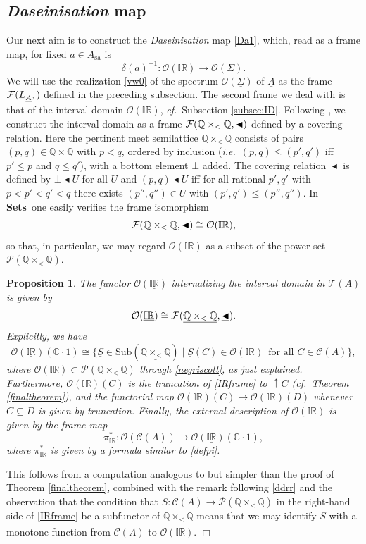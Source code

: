 \documentclass[12pt]{article}
\newcommand{\IR}{\mathbb{IR}}
\newcommand{\Q}{\mathbb{Q}}
\newcommand{\uIR}{\underline{\mathbb{IR}}}
\newcommand{\drie}{\vartriangleleft}
\newcommand{\coveredd}{\ensuremath{\mathop{\blacktriangleleft}}}
\newcommand{\beq}{\begin{equation}}
\newcommand{\eeq}{\end{equation}}
\newcommand{\Sets}{\mbox{\textbf{Sets}}}
\newcommand{\raw}{\rightarrow} \newcommand{\rat}{\mapsto}
\newcommand{\x}{\times} \newcommand{\hb}{\hbar}
\newcommand{\inv}{^{-1}}
\newcommand{\er}{\eqref}
\newcommand{\dl}{\delta} \newcommand{\Dl}{\Delta}
\newcommand{\CA}{{\mathcal A}} \newcommand{\CB}{{\mathcal B}}
\newcommand{\CO}{{\mathcal O}} \newcommand{\CP}{{\mathcal P}}
\newcommand{\C}{{\mathbb C}} \newcommand{\D}{{\mathbb D}}
\newcommand{\alg}[1]{\ensuremath{#1}}
\newcommand{\functor}[1]{\ensuremath{\underline{#1}}}
\newcommand{\context}{\ensuremath{\mathcal{C}}}
\newcommand{\asstopos}{\ensuremath{\mathcal{T}}}
\newcommand{\sa}{\ensuremath{_{\mathrm{sa}}}}
\newcommand{\uA}{\underline{A}}
\renewcommand{\CA}{\mathcal{C}(A)}
\newcommand{\TA}{\mathcal{T}(A)}
\newcommand{\ie}{\textit{i.e.}}
\newcommand{\ulS}{\functor{\Sigma}}
\renewcommand{\TA}{\asstopos(\alg{A})}
\renewcommand{\CA}{\context(\alg{A})}
\newtheorem{proposition}[theorem]{Proposition}
\newenvironment{proof}[1][Proof]%
{ \begin{trivlist}%
  \item[\hskip \labelsep {\bfseries #1}]%
}%
{ \end{trivlist}%
}
\newcommand{\qed}{\nobreak\hfill$\Box$}
\begin{document}
\subsection{\emph{Daseinisation} map}
\label{AppA:Das}
Our next aim is to construct the {\it Daseinisation} map \er{Da1}, which, read as a frame map,
for fixed $a\in A\sa$ is
\beq
\underline{\dl}(a)\inv:  \CO(\underline{\IR}) \raw \CO(\ulS).\label{Da2}\eeq
We will  use the realization \er{vw0} of the spectrum $\CO(\ulS)$ of $\uA$
as the frame $\CF(\underline{L}_{\uA},\underline{\drie})$ defined in the preceding subsection.
The second frame we deal with is that of the interval domain $\CO(\IR)$, {\it cf.}\ Subsection \ref{subsec:ID}. Following \cite{negri}, we construct the
 interval domain as a frame $\CF(\Q\x_{<}\Q,\coveredd)$ defined by a
 covering relation.
  Here the pertinent meet semilattice $\Q\x_{<}\Q$
 consists  of pairs $(p,q)\in\Q\x\Q$ with $p<q$, ordered by inclusion
 (\ie\ $(p,q)\leqslant (p',q')$ iff $p'\leqslant p$ and $q\leqslant q'$), with a bottom element $\bot$ added.
  The
 covering relation $\coveredd$ is defined by $\bot \coveredd U$ for all $U$ and
$(p,q) \coveredd U$ iff for all rational $p',q'$ with $p<p'<q'<q$ there exists $(p'',q'')\in U$ with
 $(p',q') \leqslant (p'',q'')$.
In \Sets\ one easily verifies the frame isomorphism
\beq \CF(\Q\x_{<}\Q,\coveredd)\cong\CO(\IR),\label{negriscott}\eeq
so that, in particular, we may regard $\CO(\IR)$ as a subset of the power set $\CP(\Q\x_{<}\Q)$.
\begin{proposition}\label{IRext}
The functor $\CO(\uIR)$ internalizing the interval domain in $\TA$ is given by
\beq
\CO(\uIR) \cong \CF(\underline{\Q\x_{<}\Q},\underline{\coveredd}).
  \label{negriscott2}
\eeq
Explicitly, we have
\beq \CO(\uIR)(\C\cdot 1)\cong \{\underline{S}\in\mathrm{Sub}(\underline{\Q\x_{<}\Q})\mid
  \underline{S}(C)\in \CO(\IR)\, \mbox{ for all } C\in\CA\},\label{IRframe}
  \eeq
where $\CO(\IR)\subset \CP(\Q\x_{<}\Q)$ through \er{negriscott}, as just explained. 
 Furthermore, $\CO(\uIR)(C)$ is the truncation of \er{IRframe} to $\uparrow\! C$ (cf.\ Theorem \ref{finaltheorem}), and the functorial map
 $\CO(\uIR)(C)\raw \CO(\uIR)(D)$ whenever $C\subseteq D$ is given by truncation.
Finally, the external description of $\CO(\uIR)$ is given by the frame map 
\beq
 \pi_{\IR}^*:\CO(\CA)\raw \CO(\uIR)(\C\cdot 1), \label{JTmaps}
 \eeq
where $\pi_{\IR}^*$ is given by a  formula similar to \er{defpi}.
\end{proposition}
\begin{proof}
This follows from a computation analogous to but simpler than the proof of 
Theorem \ref{finaltheorem}, combined with the remark following \er{ddrr}
and the observation that the condition that $\underline{S}:\CA\raw\CP(\Q\x_{<}\Q)$ 
in the right-hand side of \er{IRframe} be a subfunctor of  $\underline{\Q\x_{<}\Q}$ means that we may identify $\underline{S}$ with a monotone function from $\CA$ to $\CO(\IR)$. \qed
\end{proof}
\end{document}
